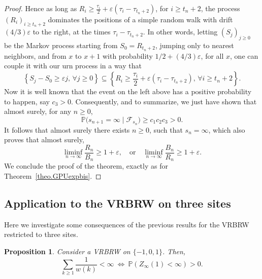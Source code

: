 \documentclass[10pt,a4paper]{amsart}
\newtheorem {prop} {Proposition} [section]
\newcommand{\1}{{\text{\Large $\mathfrak 1$}}}
\begin{document}
\begin{proof}
Hence as long as $R_i \ge \frac{\tau_i}{2} + \varepsilon(\tau_i - \tau_{t_n+2})$, for $ i\ge t_n +2$, the process $(R_i)_{i\ge t_n +2}$ dominates the positions of a simple random walk with drift $(4/3)\varepsilon$ to the right, at the times $\tau_i - \tau_{t_n+2}$. In other words, letting $(S_j)_{j\ge 0}$ be the Markov process starting from $S_0 = R_{t_n +2}$, jumping only to nearest neighbors, and from $x$ to $x+1$ with probability $1/2 + (4/3)\varepsilon$, for all $x$, one can couple it with our urn process in a way that  
$$ \left\{ S_j - S_0\ge \varepsilon j,\,  \forall j\ge 0\right\} \subseteq \left\{ R_i \ge \frac{\tau_i}{2} + \varepsilon(\tau_i - \tau_{t_n+2}), \, \forall i\ge t_n+2 \right\}. $$  
Now it is well known that the event on the left above has a positive probability to happen, say $c_3>0$. Consequently, and to summarize, we just have shown that almost surely, for any $n\ge 0$,  
$$\mathbb P\big( s_{n+1} = \infty \mid \mathcal F_{s_n}\big) \ge c_1c_2c_3>0. $$ 
It follows that almost surely there exists $n\ge 0$, such that $s_n = \infty$, which also proves that almost surely, 
$$\liminf_{n\to \infty} \frac{R_n}{B_n} \ge 1+ \varepsilon, \quad \text{or} \quad \liminf_{n\to \infty} \frac{B_n}{R_n} \ge 1+ \varepsilon. $$ 
We conclude the proof of the theorem, exactly as for Theorem~\ref{theo.GPUexpbis}.
\end{proof}


\subsection{Application to the VRBRW on three sites}\label{sec:VRBRW3sites} 
Here we investigate some consequences of the previous results for the VRBRW restricted to three sites. 
\begin{prop} \label{prop:VRBRW3sites}
Consider a VRBRW on $\{-1,0,1\}$. Then,  
$$\sum_{k\ge 1} \frac 1{w(k)}<\infty\ \Longleftrightarrow\  \mathbb P(Z_\infty(1)<\infty)>0.$$   
\end{prop}
\end{document}
